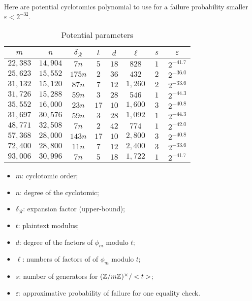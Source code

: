 Here are potential cyclotomics polynomial to use for a failure probability smaller $\varepsilon < 2^{-32}$.

\begin{table}
  \setlength{\tabcolsep}{1em}
  \centering
  \begin{tabular}{||ccc||ccccc||}
    \hline
    $~m~$ & $~n~$ & $~\delta_\mathcal{R}~$ & $~t~$ & $~d~$ & $~\ell~$ & $~s~$ & $~\varepsilon~$ \\
    \hline
    $22,383$ & $14,904$ & $7n$ & $5$  & $18$ & $828$  & $1$ &  $2^{-41.7}$ \\
    $25,623$ & $15,552$ & $175n$ & $2$ & $36$ & $432$ & $2$ & $2^{-36.0}$ \\
    $31,132$ & $15,120$ & $87n$ & $7$ & $12$ & $1,260$ & $2$ & $2^{-33.6}$ \\
    $31,726$ & $15,288$ & $59n$ & $3$ & $28$ & $546$ & $1$ & $2^{-44.3}$ \\
    $35,552$ & $16,000$ & $23n$ & $17$ & $10$ & $1,600$ & $3$ & $2^{-40.8}$ \\
    \hline
    $31,697$ & $30,576$ & $59n$ & $3$ & $28$ & $1,092$ & $1$ & $2^{-44.3}$ \\
    $48,771$ & $32,508$ & $7n$ & $2$ & $42$ & $774$ & $1$ & $2^{-42.0}$ \\
    $57,368$ & $28,000$ & $143n$ & $17$ & $10$ & $2,800$ & $3$ & $2^{-40.8}$ \\
    $72,400$ & $28,800$ & $11n$ & $7$ & $12$ & $2,400$ & $3$ & $2^{-33.6}$ \\
    $93,006$ & $30,996$ & $7n$ & $5$ & $18$ & $1,722$ & $1$ & $2^{-41.7}$ \\
    \hline
                                                   
  \end{tabular}
  \caption{Potential parameters}
  \label{tab:params}
\end{table}

\begin{itemize}
\item $m$: cyclotomic order;
\item $n$: degree of the cyclotomic;
\item $\delta_\mathcal{R}$: expansion factor (upper-bound);
\item $t$: plaintext modulus;
\item $d$: degree of the factors of $\phi_m$ modulo $t$;
\item $\ell$: numbers of factors of of $\phi_m$ modulo $t$;
\item $s$: number of generators for $(\mathbb{Z}/m\mathbb{Z})^\times/<t>$;
\item $\varepsilon$: approximative probability of failure for one equality check.
\end{itemize}

